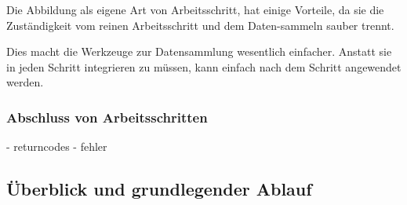 Die Abbildung als eigene Art von Arbeitsschritt,
hat einige Vorteile, da sie die Zuständigkeit vom reinen Arbeitsschritt
und dem Daten-sammeln sauber trennt.

Dies macht die Werkzeuge zur Datensammlung wesentlich einfacher.
Anstatt sie in jeden Schritt integrieren zu müssen,
kann einfach nach dem Schritt angewendet werden.


\subsubsection{Abschluss von Arbeitsschritten}

- returncodes
- fehler
\subsection{Überblick und grundlegender Ablauf}

